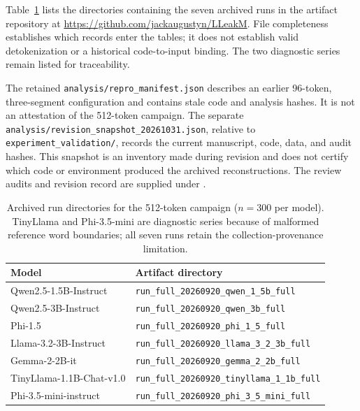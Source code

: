 \documentclass[electronics,article,submit,pdftex,moreauthors]{Definitions/mdpi}
\begin{document}
Table~\ref{tab:run_ids} lists the directories containing the seven archived runs in the artifact repository at \url{https://github.com/jackaugustyn/LLeakM}. File completeness establishes which records enter the tables; it does not establish valid detokenization or a historical code-to-input binding. The two diagnostic series remain listed for traceability.

The retained \texttt{analysis/repro\_manifest.json} describes an earlier 96-token, three-segment configuration and contains stale code and analysis hashes. It is not an attestation of the 512-token campaign. The separate \texttt{analysis/revision\_snapshot\_20261031.json}, relative to \texttt{experiment\_validation/}, records the current manuscript, code, data, and audit hashes. This snapshot is an inventory made during revision and does not certify which code or environment produced the archived reconstructions. The review audits and revision record are supplied under .

\begin{table}[ht]
\centering
\caption{Archived run directories for the 512-token campaign ($n=300$ per model). TinyLlama and Phi-3.5-mini are diagnostic series because of malformed reference word boundaries; all seven runs retain the collection-provenance limitation.}
\label{tab:run_ids}
\begin{tabular}{l l}
\toprule
Model & Artifact directory \\
\midrule
Qwen2.5-1.5B-Instruct & \texttt{run\_full\_20260920\_qwen\_1\_5b\_full} \\
Qwen2.5-3B-Instruct & \texttt{run\_full\_20260920\_qwen\_3b\_full} \\
Phi-1.5 & \texttt{run\_full\_20260920\_phi\_1\_5\_full} \\
Llama-3.2-3B-Instruct & \texttt{run\_full\_20260920\_llama\_3\_2\_3b\_full} \\
Gemma-2-2B-it & \texttt{run\_full\_20260920\_gemma\_2\_2b\_full} \\
TinyLlama-1.1B-Chat-v1.0 & \texttt{run\_full\_20260920\_tinyllama\_1\_1b\_full} \\
Phi-3.5-mini-instruct & \texttt{run\_full\_20260920\_phi\_3\_5\_mini\_full} \\
\bottomrule
\end{tabular}
\end{table}
\end{document}
